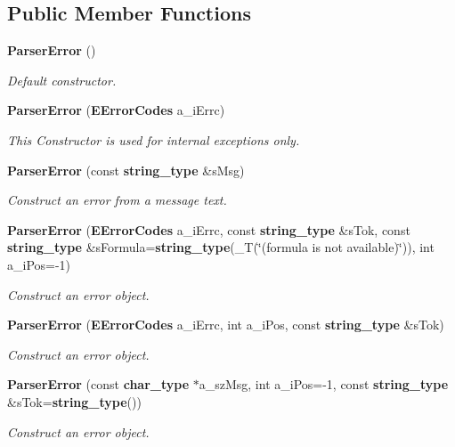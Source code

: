 \subsection*{Public Member Functions}
\begin{CompactItemize}
\item 
{\bf ParserError} ()
\begin{CompactList}\small\item\em Default constructor. \item\end{CompactList}\item 
{\bf ParserError} ({\bf EErrorCodes} a\_\-iErrc)
\begin{CompactList}\small\item\em This Constructor is used for internal exceptions only. \item\end{CompactList}\item 
{\bf ParserError} (const {\bf string\_\-type} \&sMsg)
\begin{CompactList}\small\item\em Construct an error from a message text. \item\end{CompactList}\item 
{\bf ParserError} ({\bf EErrorCodes} a\_\-iErrc, const {\bf string\_\-type} \&sTok, const {\bf string\_\-type} \&sFormula={\bf string\_\-type}(\_\-T(\char`\"{}(formula is not available)\char`\"{})), int a\_\-iPos=-1)
\begin{CompactList}\small\item\em Construct an error object. \item\end{CompactList}\item 
{\bf ParserError} ({\bf EErrorCodes} a\_\-iErrc, int a\_\-iPos, const {\bf string\_\-type} \&sTok)
\begin{CompactList}\small\item\em Construct an error object. \item\end{CompactList}\item 
{\bf ParserError} (const {\bf char\_\-type} $\ast$a\_\-szMsg, int a\_\-iPos=-1, const {\bf string\_\-type} \&sTok={\bf string\_\-type}())
\begin{CompactList}\small\item\em Construct an error object. \item\end{CompactList}\item 

\end{CompactItemize}
